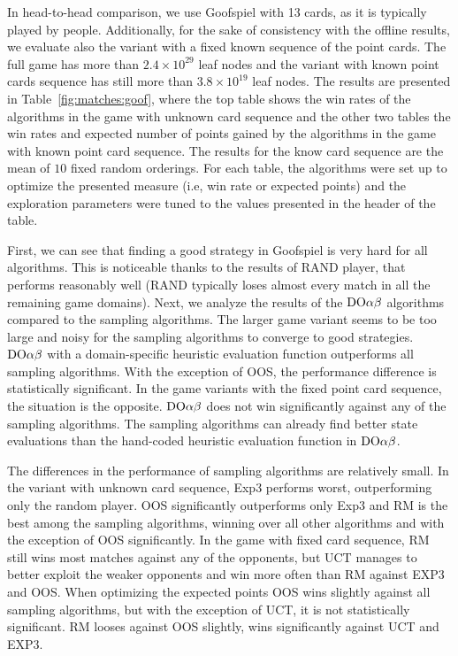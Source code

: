 In head-to-head comparison, we use Goofspiel with 13 cards, as it is typically played by people. Additionally, for the sake of consistency with the offline results, we evaluate also the variant with a fixed known sequence of the point cards. The full game has more than $2.4\times 10^{29}$ leaf nodes and the variant with known point cards sequence has still more than $3.8\times 10^{19}$ leaf nodes. The results are presented in Table~\ref{fig:matches:goof}, where the top table shows the win rates of the algorithms in the game with unknown card sequence and the other two tables the win rates and expected number of points gained by the algorithms in the game with known point card sequence. The results for the know card sequence are the mean of $10$ fixed random orderings. For each table, the algorithms were set up to optimize the presented measure (i.e, win rate or expected points) and the exploration parameters were tuned to the values presented in the header of the table.

First, we can see that finding a good strategy in Goofspiel is very hard for all algorithms.
This is noticeable thanks to the results of RAND player, that performs reasonably well (RAND typically loses almost every match in all the remaining game domains). 
Next, we analyze the results of the $\textrm{DO}\alpha\beta$ algorithms compared to the sampling algorithms.
The larger game variant seems to be too large and noisy for the sampling algorithms to converge to good strategies.
$\textrm{DO}\alpha\beta$ with a domain-specific heuristic evaluation function outperforms all sampling algorithms.
With the exception of OOS, the performance difference is statistically significant.
In the game variants with the fixed point card sequence, the situation is the opposite.
$\textrm{DO}\alpha\beta$ does not win significantly against any of the sampling algorithms.
The sampling algorithms can already find better state evaluations than the hand-coded heuristic evaluation function in $\textrm{DO}\alpha\beta$.

The differences in the performance of sampling algorithms are relatively small.
In the variant with unknown card sequence, Exp3 performs worst, outperforming only the random player. 
OOS significantly outperforms only Exp3 and RM is the best among the sampling algorithms, winning over all other algorithms and with the exception of OOS significantly.
In the game with fixed card sequence, RM still wins most matches against any of the opponents, but UCT manages to better exploit the weaker opponents and win more often than RM against EXP3 and OOS.
When optimizing the expected points OOS wins slightly against all sampling algorithms, but with the exception of UCT, it is not statistically significant. RM looses against OOS slightly, wins significantly against UCT and EXP3.

